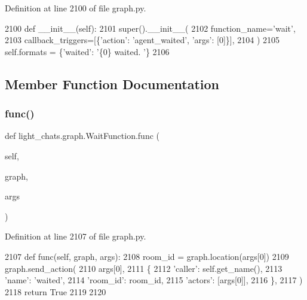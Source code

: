 Definition at line 2100 of file graph.\+py.


\begin{DoxyCode}
2100     \textcolor{keyword}{def }\_\_init\_\_(self):
2101         super().\_\_init\_\_(
2102             function\_name=\textcolor{stringliteral}{'wait'},
2103             callback\_triggers=[\{\textcolor{stringliteral}{'action'}: \textcolor{stringliteral}{'agent\_waited'}, \textcolor{stringliteral}{'args'}: [0]\}],
2104         )
2105         self.formats = \{\textcolor{stringliteral}{'waited'}: \textcolor{stringliteral}{'\{0\} waited. '}\}
2106 
\end{DoxyCode}


\subsection{Member Function Documentation}
\mbox{\label{classlight__chats_1_1graph_1_1WaitFunction_a3349dc4d65c4b33440624bdbbeeb420c}} 
\subsubsection{\texorpdfstring{func()}{func()}}
{\footnotesize\ttfamily def light\+\_\+chats.\+graph.\+Wait\+Function.\+func (\begin{DoxyParamCaption}\item[{}]{self,  }\item[{}]{graph,  }\item[{}]{args }\end{DoxyParamCaption})}



Definition at line 2107 of file graph.\+py.


\begin{DoxyCode}
2107     \textcolor{keyword}{def }func(self, graph, args):
2108         room\_id = graph.location(args[0])
2109         graph.send\_action(
2110             args[0],
2111             \{
2112                 \textcolor{stringliteral}{'caller'}: self.get\_name(),
2113                 \textcolor{stringliteral}{'name'}: \textcolor{stringliteral}{'waited'},
2114                 \textcolor{stringliteral}{'room\_id'}: room\_id,
2115                 \textcolor{stringliteral}{'actors'}: [args[0]],
2116             \},
2117         )
2118         \textcolor{keywordflow}{return} \textcolor{keyword}{True}
2119 
2120 
\end{DoxyCode}


